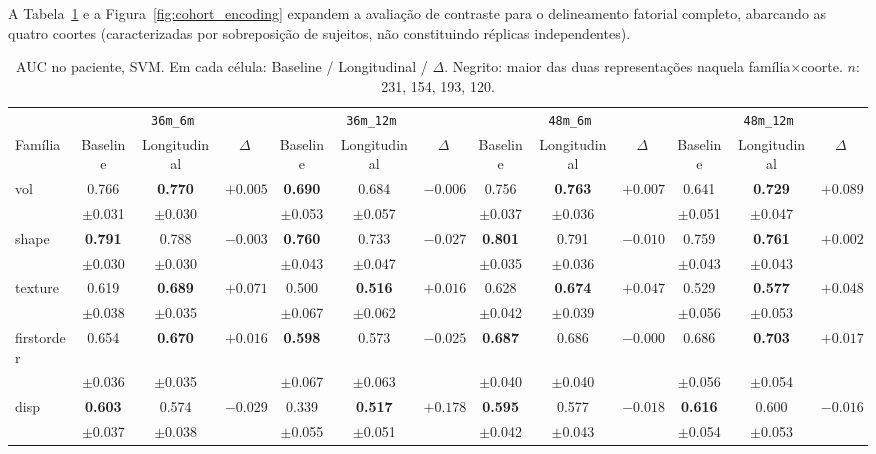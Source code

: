 \documentclass[review]{elsarticle}
\newcommand{\code}[1]{\texttt{#1}}
\begin{document}
	A Tabela~\ref{tab:uni_4} e a Figura~\ref{fig:cohort_encoding} expandem a avaliação de contraste para o delineamento fatorial completo, abarcando as quatro coortes (caracterizadas por sobreposição de sujeitos, não constituindo réplicas independentes). 
	
	\begin{table}
		\centering
		\footnotesize
		\setlength{\tabcolsep}{3.5pt}
		\caption{AUC no paciente, SVM.
			Em cada célula: Baseline / Longitudinal / $\Delta$.
			Negrito: maior das duas representações naquela família$\times$coorte.
			$n$: 231, 154, 193, 120.}
		\label{tab:uni_4}
		\begin{tabular}{@{}l ccc ccc ccc ccc@{}}
			\toprule
			& \multicolumn{3}{c}{\code{36m\_6m}} & \multicolumn{3}{c}{\code{36m\_12m}} & \multicolumn{3}{c}{\code{48m\_6m}} & \multicolumn{3}{c}{\code{48m\_12m}} \\
			\cmidrule(lr){2-4}\cmidrule(lr){5-7}\cmidrule(lr){8-10}\cmidrule(lr){11-13}
			Família & Baseline & Longitudinal  & $\Delta$ & Baseline & Longitudinal  & $\Delta$ & Baseline & Longitudinal  & $\Delta$ & Baseline & Longitudinal  & $\Delta$ \\
			\midrule
			vol & 0.766 & \textbf{0.770} & $+0.005$ & \textbf{0.690} & 0.684 & $-0.006$ & 0.756 & \textbf{0.763} & $+0.007$ & 0.641 & \textbf{0.729} & $+0.089$ \\
			& $\pm$0.031 & $\pm$0.030 & & $\pm$0.053 & $\pm$0.057 & & $\pm$0.037 & $\pm$0.036 & & $\pm$0.051 & $\pm$0.047 & \\
			shape & \textbf{0.791} & 0.788 & $-0.003$ & \textbf{0.760} & 0.733 & $-0.027$ & \textbf{0.801} & 0.791 & $-0.010$ & 0.759 & \textbf{0.761} & $+0.002$ \\
			& $\pm$0.030 & $\pm$0.030 & & $\pm$0.043 & $\pm$0.047 & & $\pm$0.035 & $\pm$0.036 & & $\pm$0.043 & $\pm$0.043 & \\
			texture & 0.619 & \textbf{0.689} & $+0.071$ & 0.500 & \textbf{0.516} & $+0.016$ & 0.628 & \textbf{0.674} & $+0.047$ & 0.529 & \textbf{0.577} & $+0.048$ \\
			& $\pm$0.038 & $\pm$0.035 & & $\pm$0.067 & $\pm$0.062 & & $\pm$0.042 & $\pm$0.039 & & $\pm$0.056 & $\pm$0.053 & \\
			firstorder & 0.654 & \textbf{0.670} & $+0.016$ & \textbf{0.598} & 0.573 & $-0.025$ & \textbf{0.687} & 0.686 & $-0.000$ & 0.686 & \textbf{0.703} & $+0.017$ \\
			& $\pm$0.036 & $\pm$0.035 & & $\pm$0.067 & $\pm$0.063 & & $\pm$0.040 & $\pm$0.040 & & $\pm$0.056 & $\pm$0.054 & \\
			disp & \textbf{0.603} & 0.574 & $-0.029$ & 0.339 & \textbf{0.517} & $+0.178$ & \textbf{0.595} & 0.577 & $-0.018$ & \textbf{0.616} & 0.600 & $-0.016$ \\
			& $\pm$0.037 & $\pm$0.038 & & $\pm$0.055 & $\pm$0.051 & & $\pm$0.042 & $\pm$0.043 & & $\pm$0.054 & $\pm$0.053 & \\
			\bottomrule
		\end{tabular}
	\end{table}
	
\end{document}
